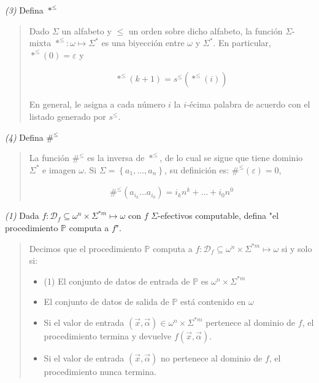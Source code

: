 \documentclass[a4paper, 12pt]{article}
\begin{document}
\textit{(3)} Defina $*^{\leq}$


\small
\begin{quote}

Dado $\Sigma$ un alfabeto y $\leq$ un orden sobre dicho alfabeto, la función
$\Sigma$-mixta $*^{\leq} : \omega \mapsto \Sigma^{*}$ es una biyección entre
$\omega$ y $\Sigma^{*}$. En particular, $*^{\leq}(0) = \varepsilon $ y

\begin{align*}
    *^{\leq}(k + 1) = s^{\leq}( *^{\leq}(i) )
\end{align*}

En general, le asigna a cada número $i$ la $i$-écima palabra de acuerdo con el
listado generado por $s^{\leq}$.

\end{quote}
\normalsize

\textit{(4)} Defina $\#^{\leq}$


\small
\begin{quote}

    La función $\#^{\leq}$ es la inversa de $*^{\leq}$, de lo cual se sigue que
    tiene dominio $\Sigma^{*}$ e imagen $\omega$. Si $\Sigma = \left\{ a_1,
    \ldots, a_n \right\} $, su definición es:
    $\#^{\leq}(\varepsilon ) = 0$, 

    \begin{align*}
        \#^{\leq}(a_{i_k} \ldots a_{i_0}) = i_kn^k + \ldots + i_0 n^0
    \end{align*}

\end{quote}
\normalsize

\pagebreak 

\textit{(1)} Dada $f : \mathcal{D}_f \subseteq \omega^{n} \times \Sigma^{*m}
\mapsto \omega$ con $f$ $\Sigma$-efectivos computable, defina "el procedimiento
$\mathbb{P}$ computa a $f$".


\small
\begin{quote}

Decimos que el procedimiento $\mathbb{P}$ computa  a $f : \mathcal{D}_f
\subseteq \omega^{n} \times \Sigma^{*m} \mapsto \omega$ si y solo si: 

\begin{itemize}
    \item (1) El conjunto de datos de entrada de $\mathbb{P}$ es $\omega^{n} \times \Sigma^{*m} $ 
    \item El conjunto de datos de salida de $\mathbb{P}$ está contenido en $\omega$ 
    \item Si el valor de entrada $(\vec{x}, \vec{\alpha}) \in \omega^{n} \times
        \Sigma^{*m} $ pertenece al dominio de $f$, el procedimiento termina y
        devuelve $f(\vec{x}, \vec{\alpha}) $. 
    \item Si el valor de entrada $(\vec{x}, \vec{\alpha}) $ no pertenece al
        dominio de $f$, el procedimiento nunca termina.
\end{itemize}




\end{quote}
\normalsize
\end{document}

